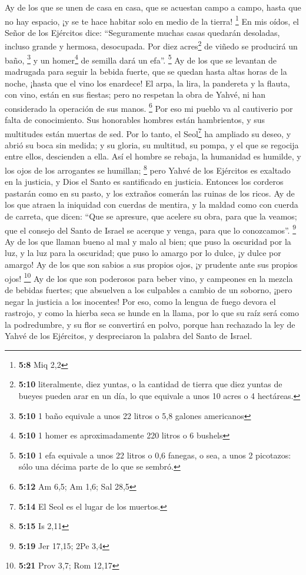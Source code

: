  Ay de los que se unen de casa en casa, que se acuestan
campo a campo, hasta que no hay espacio, ¡y se te hace habitar solo en
medio de la tierra! \footnote{\textbf{5:8} Miq 2,2}  En
mis oídos, el Señor de los Ejércitos dice: ``Seguramente muchas casas
quedarán desoladas, incluso grande y hermosa, desocupada.
 Por diez acres\footnote{\textbf{5:10} literalmente, diez
  yuntas, o la cantidad de tierra que diez yuntas de bueyes pueden arar
  en un día, lo que equivale a unos 10 acres o 4 hectáreas.} de viñedo
se producirá un baño, \footnote{\textbf{5:10} 1 baño equivale a unos 22
  litros o 5,8 galones americanos} y un homer\footnote{\textbf{5:10} 1
  homer es aproximadamente 220 litros o 6 bushels} de semilla dará un
efa''. \footnote{\textbf{5:10} 1 efa equivale a unos 22 litros o 0,6
  fanegas, o sea, a unos 2 picotazos: sólo una décima parte de lo que se
  sembró.}  Ay de los que se levantan de madrugada para
seguir la bebida fuerte, que se quedan hasta altas horas de la noche,
¡hasta que el vino los enardece!  El arpa, la lira, la
pandereta y la flauta, con vino, están en sus fiestas; pero no respetan
la obra de Yahvé, ni han considerado la operación de sus manos.
\footnote{\textbf{5:12} Am 6,5; Am 1,6; Sal 28,5}  Por
eso mi pueblo va al cautiverio por falta de conocimiento. Sus honorables
hombres están hambrientos, y sus multitudes están muertas de sed.
 Por lo tanto, el Seol\footnote{\textbf{5:14} El Seol es
  el lugar de los muertos.} ha ampliado su deseo, y abrió su boca sin
medida; y su gloria, su multitud, su pompa, y el que se regocija entre
ellos, descienden a ella.  Así el hombre se rebaja, la
humanidad es humilde, y los ojos de los arrogantes se humillan;
\footnote{\textbf{5:15} Is 2,11}  pero Yahvé de los
Ejércitos es exaltado en la justicia, y Dios el Santo es santificado en
justicia.  Entonces los corderos pastarán como en su
pasto, y los extraños comerán las ruinas de los ricos. 
Ay de los que atraen la iniquidad con cuerdas de mentira, y la maldad
como con cuerda de carreta,  que dicen: ``Que se
apresure, que acelere su obra, para que la veamos; que el consejo del
Santo de Israel se acerque y venga, para que lo conozcamos''.
\footnote{\textbf{5:19} Jer 17,15; 2Pe 3,4}  Ay de los
que llaman bueno al mal y malo al bien; que puso la oscuridad por la
luz, y la luz para la oscuridad; que puso lo amargo por lo dulce, ¡y
dulce por amargo!  Ay de los que son sabios a sus propios
ojos, ¡y prudente ante sus propios ojos! \footnote{\textbf{5:21} Prov
  3,7; Rom 12,17}  Ay de los que son poderosos para beber
vino, y campeones en la mezcla de bebidas fuertes;  que
absuelven a los culpables a cambio de un soborno, ¡pero negar la
justicia a los inocentes!  Por eso, como la lengua de
fuego devora el rastrojo, y como la hierba seca se hunde en la llama,
por lo que su raíz será como la podredumbre, y su flor se convertirá en
polvo, porque han rechazado la ley de Yahvé de los Ejércitos, y
despreciaron la palabra del Santo de Israel.

